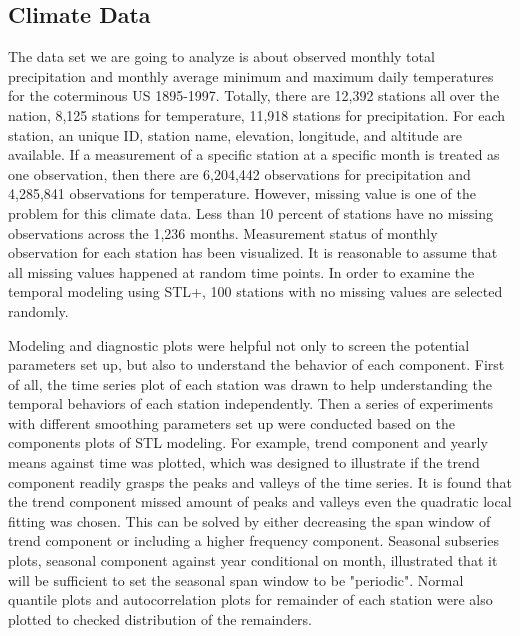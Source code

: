 \subsection{Climate Data}
The data set we are going to analyze is about observed monthly total precipitation and monthly 
average minimum and maximum daily temperatures for the coterminous US 1895-1997. Totally, there are 
12,392 stations all over the nation, 8,125 stations for temperature, 11,918 stations for 
precipitation. For each station, an unique ID, station name, elevation, longitude, and altitude are
available. If a measurement of a specific station at a specific month is treated as one observation,
then there are 6,204,442 observations for precipitation and 4,285,841 observations for temperature. 
However, missing value is one of the problem for this climate data. Less than 10 percent of stations
have no missing observations across the 1,236 months. Measurement status of monthly observation for 
each station has been visualized. It is reasonable to assume that all missing values happened at 
random time points. In order to examine the temporal modeling using STL+, 100 stations with no 
missing values are selected randomly. 

Modeling and diagnostic plots were helpful not only to screen the potential parameters set up, but 
also to understand the behavior of each component. First of all, the time series plot of each 
station was drawn to help understanding the temporal behaviors of each station independently. Then a
series of experiments with different smoothing parameters set up were conducted based on the 
components plots of STL modeling. For example, trend component and yearly means against time was 
plotted, which was designed to illustrate if the trend component readily grasps the peaks and 
valleys of the time series. It is found that the trend component missed amount of peaks and valleys
even the quadratic local fitting was chosen. This can be solved by either decreasing the span 
window of trend component or including a higher frequency component. Seasonal subseries plots, 
seasonal component against year conditional on month, illustrated that it will be sufficient to set 
the seasonal span window to be "periodic". Normal quantile plots and autocorrelation plots for 
remainder of each station were also plotted to checked distribution of the remainders.

